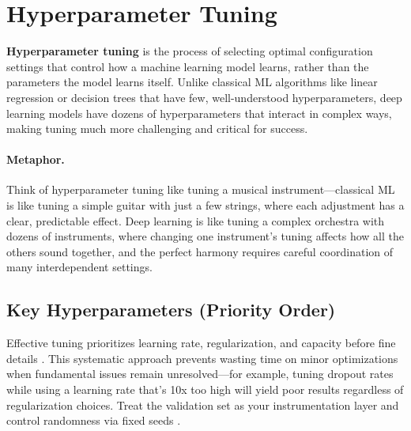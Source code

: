 
\section{Hyperparameter Tuning }
\label{sec:hyperparameter-tuning}

\textbf{Hyperparameter tuning} is the process of selecting optimal configuration settings that control how a machine learning model learns, rather than the parameters the model learns itself. Unlike classical ML algorithms like linear regression or decision trees that have few, well-understood hyperparameters, deep learning models have dozens of hyperparameters that interact in complex ways, making tuning much more challenging and critical for success.

\paragraph{Metaphor.} Think of hyperparameter tuning like tuning a musical instrument—classical ML is like tuning a simple guitar with just a few strings, where each adjustment has a clear, predictable effect. Deep learning is like tuning a complex orchestra with dozens of instruments, where changing one instrument's tuning affects how all the others sound together, and the perfect harmony requires careful coordination of many interdependent settings.


\subsection{Key Hyperparameters (Priority Order)}

Effective tuning prioritizes learning rate, regularization, and capacity before fine details . This systematic approach prevents wasting time on minor optimizations when fundamental issues remain unresolved—for example, tuning dropout rates while using a learning rate that's 10x too high will yield poor results regardless of regularization choices. Treat the validation set as your instrumentation layer and control randomness via fixed seeds \textcite{GoodfellowEtAl2016,Prince2023,D2LChapterOptimization}.

